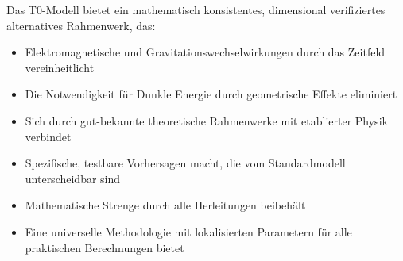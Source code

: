 \documentclass[12pt,a4paper]{article}
\begin{document}
	\begin{tcolorbox}[colback=green!5!white,colframe=green!75!black,title=T0-Modell: Ein einheitlicher Rahmen]
		Das T0-Modell bietet ein mathematisch konsistentes, dimensional verifiziertes alternatives Rahmenwerk, das:
		\begin{itemize}
			\item Elektromagnetische und Gravitationswechselwirkungen durch das Zeitfeld vereinheitlicht
			\item Die Notwendigkeit für Dunkle Energie durch geometrische Effekte eliminiert
			\item Sich durch gut-bekannte theoretische Rahmenwerke mit etablierter Physik verbindet
			\item Spezifische, testbare Vorhersagen macht, die vom Standardmodell unterscheidbar sind
			\item Mathematische Strenge durch alle Herleitungen beibehält
			\item Eine universelle Methodologie mit lokalisierten Parametern für alle praktischen Berechnungen bietet
		\end{itemize}
	\end{tcolorbox}
	
\end{document}
